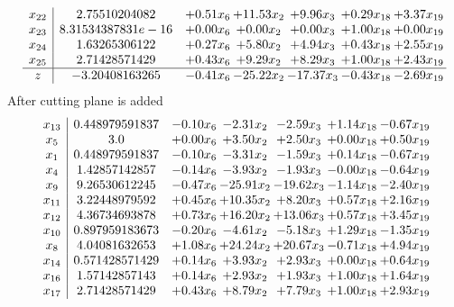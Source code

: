 \documentclass[8pt]{article}
\begin{document}
\[\begin{array}{c| c c@{\hskip 2pt} c@{\hskip 2pt} c@{\hskip 2pt} c@{\hskip 2pt} c@{\hskip 2pt} }
 x_{22}   &  2.75510204082 & +  0.51 x_{6} & + 11.53 x_{2} & +  9.96 x_{3} & +  0.29 x_{18} & +  3.37 x_{19}\\
 x_{23}   &  8.31534387831e-16 & +  0.00 x_{6} & +  0.00 x_{2} & +  0.00 x_{3} & +  1.00 x_{18} & +  0.00 x_{19}\\
 x_{24}   &  1.63265306122 & +  0.27 x_{6} & +  5.80 x_{2} & +  4.94 x_{3} & +  0.43 x_{18} & +  2.55 x_{19}\\
 x_{25}   &  2.71428571429 & +  0.43 x_{6} & +  9.29 x_{2} & +  8.29 x_{3} & +  1.00 x_{18} & +  2.43 x_{19}\\
\hline
z    &  -3.20408163265 & -0.41 x_{6} & -25.22 x_{2} & -17.37 x_{3} & -0.43 x_{18} & -2.69 x_{19}\\
\end{array}\]
 After cutting plane is added 
\[\begin{array}{c| c c@{\hskip 2pt} c@{\hskip 2pt} c@{\hskip 2pt} c@{\hskip 2pt} c@{\hskip 2pt} }
 x_{13}   &  0.448979591837 & -0.10 x_{6} & -2.31 x_{2} & -2.59 x_{3} & +  1.14 x_{18} & -0.67 x_{19}\\
 x_{5}   &  3.0 & +  0.00 x_{6} & +  3.50 x_{2} & +  2.50 x_{3} & +  0.00 x_{18} & +  0.50 x_{19}\\
 x_{1}   &  0.448979591837 & -0.10 x_{6} & -3.31 x_{2} & -1.59 x_{3} & +  0.14 x_{18} & -0.67 x_{19}\\
 x_{4}   &  1.42857142857 & -0.14 x_{6} & -3.93 x_{2} & -1.93 x_{3} & -0.00 x_{18} & -0.64 x_{19}\\
 x_{9}   &  9.26530612245 & -0.47 x_{6} & -25.91 x_{2} & -19.62 x_{3} & -1.14 x_{18} & -2.40 x_{19}\\
 x_{11}   &  3.22448979592 & +  0.45 x_{6} & + 10.35 x_{2} & +  8.20 x_{3} & +  0.57 x_{18} & +  2.16 x_{19}\\
 x_{12}   &  4.36734693878 & +  0.73 x_{6} & + 16.20 x_{2} & + 13.06 x_{3} & +  0.57 x_{18} & +  3.45 x_{19}\\
 x_{10}   &  0.897959183673 & -0.20 x_{6} & -4.61 x_{2} & -5.18 x_{3} & +  1.29 x_{18} & -1.35 x_{19}\\
 x_{8}   &  4.04081632653 & +  1.08 x_{6} & + 24.24 x_{2} & + 20.67 x_{3} & -0.71 x_{18} & +  4.94 x_{19}\\
 x_{14}   &  0.571428571429 & +  0.14 x_{6} & +  3.93 x_{2} & +  2.93 x_{3} & +  0.00 x_{18} & +  0.64 x_{19}\\
 x_{16}   &  1.57142857143 & +  0.14 x_{6} & +  2.93 x_{2} & +  1.93 x_{3} & +  1.00 x_{18} & +  1.64 x_{19}\\
 x_{17}   &  2.71428571429 & +  0.43 x_{6} & +  8.79 x_{2} & +  7.79 x_{3} & +  1.00 x_{18} & +  2.93 x_{19}\\

\end{array}\]
\end{document}
